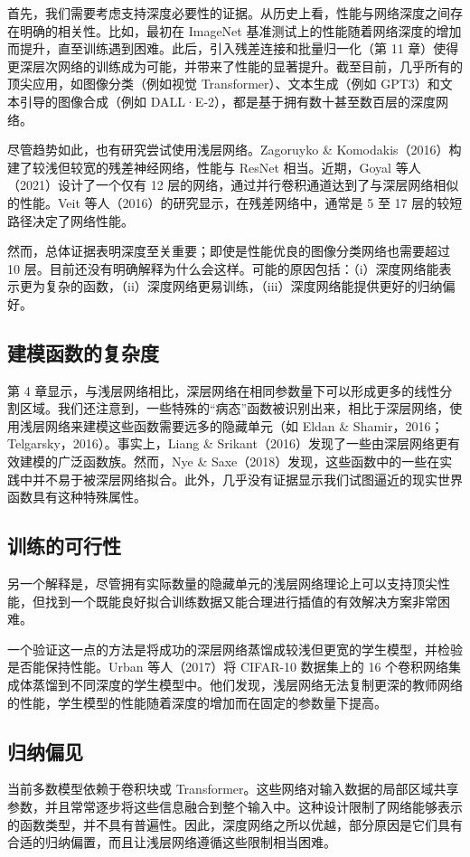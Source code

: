 \documentclass[lang=cn,newtx,10pt,scheme=chinese]{elegantbook}
\begin{document}
首先，我们需要考虑支持深度必要性的证据。从历史上看，性能与网络深度之间存在明确的相关性。比如，最初在 ImageNet 基准测试上的性能随着网络深度的增加而提升，直至训练遇到困难。此后，引入残差连接和批量归一化（第 11 章）使得更深层次网络的训练成为可能，并带来了性能的显著提升。截至目前，几乎所有的顶尖应用，如图像分类（例如视觉 Transformer）、文本生成（例如 GPT3）和文本引导的图像合成（例如 DALL·E-2），都是基于拥有数十甚至数百层的深度网络。

尽管趋势如此，也有研究尝试使用浅层网络。Zagoruyko \& Komodakis（2016）构建了较浅但较宽的残差神经网络，性能与 ResNet 相当。近期，Goyal 等人（2021）设计了一个仅有 12 层的网络，通过并行卷积通道达到了与深层网络相似的性能。Veit 等人（2016）的研究显示，在残差网络中，通常是 5 至 17 层的较短路径决定了网络性能。

然而，总体证据表明深度至关重要；即使是性能优良的图像分类网络也需要超过 10 层。目前还没有明确解释为什么会这样。可能的原因包括：（i）深度网络能表示更为复杂的函数，（ii）深度网络更易训练，（iii）深度网络能提供更好的归纳偏好。


\subsection{建模函数的复杂度}
第 4 章显示，与浅层网络相比，深层网络在相同参数量下可以形成更多的线性分割区域。我们还注意到，一些特殊的“病态”函数被识别出来，相比于深层网络，使用浅层网络来建模这些函数需要远多的隐藏单元（如 Eldan \& Shamir，2016；Telgarsky，2016）。事实上，Liang \& Srikant（2016）发现了一些由深层网络更有效建模的广泛函数族。然而，Nye \& Saxe（2018）发现，这些函数中的一些在实践中并不易于被深层网络拟合。此外，几乎没有证据显示我们试图逼近的现实世界函数具有这种特殊属性。

\subsection{训练的可行性}
另一个解释是，尽管拥有实际数量的隐藏单元的浅层网络理论上可以支持顶尖性能，但找到一个既能良好拟合训练数据又能合理进行插值的有效解决方案非常困难。

一个验证这一点的方法是将成功的深层网络蒸馏成较浅但更宽的学生模型，并检验是否能保持性能。Urban 等人（2017）将 CIFAR-10 数据集上的 16 个卷积网络集成体蒸馏到不同深度的学生模型中。他们发现，浅层网络无法复制更深的教师网络的性能，学生模型的性能随着深度的增加而在固定的参数量下提高。

\subsection{归纳偏见}
当前多数模型依赖于卷积块或 Transformer。这些网络对输入数据的局部区域共享参数，并且常常逐步将这些信息融合到整个输入中。这种设计限制了网络能够表示的函数类型，并不具有普遍性。因此，深度网络之所以优越，部分原因是它们具有合适的归纳偏置，而且让浅层网络遵循这些限制相当困难。
\end{document}
